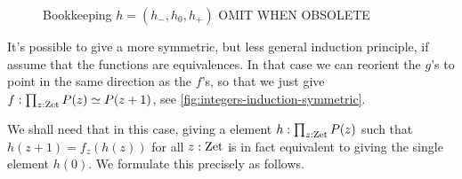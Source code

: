 \documentclass[a4,12pt]{amsart}
\begin{document}
\begin{figure}
  \centering
  \caption{Bookkeeping $h=(h_-,h_0,h_+)$ OMIT WHEN OBSOLETE}
  \label{fig:bookkeeping-h-h0h+}
\end{figure}

It's possible to give a more symmetric, but less general induction principle,
if assume that the functions are equivalences.
In that case we can reorient the $g$'s to point in the same direction as the $f$'s,
so that we just give $f : \prod_{z:\mathrm{Zet}}P(z) \simeq P(z+1)$, 
see \cref{fig:integers-induction-symmetric}.

We shall need that in this case, giving a element $h:\prod_{z:\mathrm{Zet}}P(z)$
such that $h(z+1) = f_z(h(z))$ for all $z:\mathrm{Zet}$
is in fact equivalent to giving the single element $h(0)$.
We formulate this precisely as follows.
\end{document}
